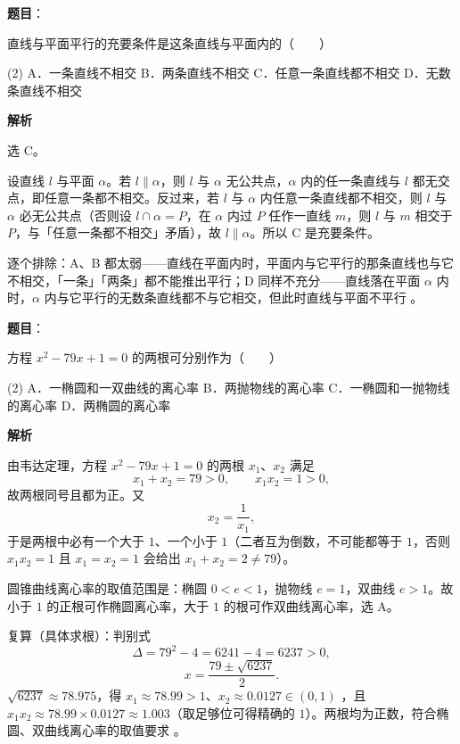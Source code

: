 \begin{answer}

\textbf{题目}：

直线与平面平行的充要条件是这条直线与平面内的\mbox{（　　）}

\begin{gkopts}(2)
\task A．一条直线不相交
\task B．两条直线不相交
\task C．任意一条直线都不相交
\task D．无数条直线不相交
\end{gkopts}

\textbf{解析}

选 C。

设直线 $l$ 与平面 $\alpha$。若 $l\parallel\alpha$，则 $l$ 与 $\alpha$ 无公共点，$\alpha$ 内的任一条直线与 $l$ 都无交点，即任意一条都不相交。反过来，若 $l$ 与 $\alpha$ 内任意一条直线都不相交，则 $l$ 与 $\alpha$ 必无公共点（否则设 $l\cap\alpha=P$，在 $\alpha$ 内过 $P$ 任作一直线 $m$，则 $l$ 与 $m$ 相交于 $P$，与「任意一条都不相交」矛盾），故 $l\parallel\alpha$。所以 C 是充要条件。

逐个排除：A、B 都太弱——直线在平面内时，平面内与它平行的那条直线也与它不相交，「一条」「两条」都不能推出平行；D 同样不充分——直线落在平面 $\alpha$ 内时，$\alpha$ 内与它平行的无数条直线都不与它相交，但此时直线与平面不平行 。


\end{answer}
\begin{answer}

\textbf{题目}：

方程 $x^2-79x+1=0$ 的两根可分别作为\mbox{（　　）}

\begin{gkopts}(2)
\task A．一椭圆和一双曲线的离心率
\task B．两抛物线的离心率
\task C．一椭圆和一抛物线的离心率
\task D．两椭圆的离心率
\end{gkopts}

\textbf{解析}

由韦达定理，方程 $x^2-79x+1=0$ 的两根 $x_1$、$x_2$ 满足
\nopagebreak[4]
\[
x_1+x_2=79>0,\qquad x_1x_2=1>0,
\]
故两根同号且都为正。又
\nopagebreak[4]
\[
x_2=\frac1{x_1},
\]
于是两根中必有一个大于 $1$、一个小于 $1$（二者互为倒数，不可能都等于 $1$，否则 $x_1x_2=1$ 且 $x_1=x_2=1$ 会给出 $x_1+x_2=2\ne79$）。

圆锥曲线离心率的取值范围是：椭圆 $0<e<1$，抛物线 $e=1$，双曲线 $e>1$。故小于 $1$ 的正根可作椭圆离心率，大于 $1$ 的根可作双曲线离心率，选 A。

复算（具体求根）：判别式
\nopagebreak[4]
\[
\Delta=79^2-4=6241-4=6237>0,
\]
\nopagebreak[4]
\[
x=\frac{79\pm\sqrt{6237}}{2}.
\]
$\sqrt{6237}\approx78.975$，得 $x_1\approx78.99>1$、$x_2\approx0.0127\in(0,1)$ ，且 $x_1x_2\approx78.99\times0.0127\approx1.003$（取足够位可得精确的 $1$）。两根均为正数，符合椭圆、双曲线离心率的取值要求 。


\end{answer}
